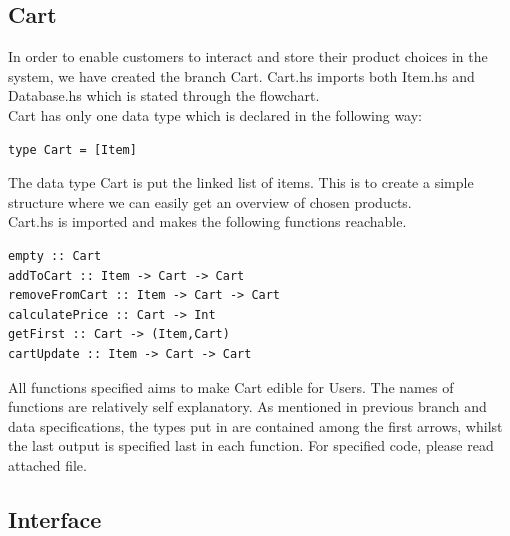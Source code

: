 \documentclass[11pt]{article}
\begin{document}
\subsection{Cart}
In order to enable customers to interact and store their product choices in the system, we have created the branch Cart. Cart.hs imports both Item.hs and Database.hs which is stated through the flowchart.\\
Cart has only one data type which is declared in the following way:\\
\begin{lstlisting}
type Cart = [Item]
\end{lstlisting}
The data type Cart is put the linked list of items. This is to create a simple structure where we can easily get an overview of chosen products.\\
Cart.hs is imported and makes the following functions reachable.\\
\begin{lstlisting}
empty :: Cart
addToCart :: Item -> Cart -> Cart
removeFromCart :: Item -> Cart -> Cart
calculatePrice :: Cart -> Int
getFirst :: Cart -> (Item,Cart)
cartUpdate :: Item -> Cart -> Cart
\end{lstlisting}
All functions specified aims to make Cart edible for Users. The names of functions are relatively self explanatory. As mentioned in previous branch and data specifications, the types put in are contained among the first arrows, whilst the last output is specified last in each function. For specified code, please read attached file.
\newpage
\subsection{Interface}
\end{document}
